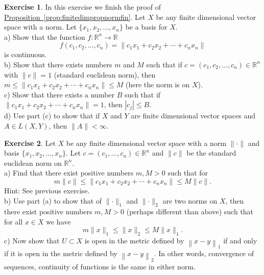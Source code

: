 \documentclass[12pt]{book}
\newcommand{\snorm}[1]{\lVert {#1} \rVert}
\newcommand{\abs}[1]{\left\lvert {#1} \right\rvert}
\newcommand{\norm}[1]{\left\lVert {#1} \right\rVert}
\newcommand{\R}{{\mathbb{R}}}
\theoremstyle{plain}
\theoremstyle{remark}
\theoremstyle{definition}
\theoremstyle{exercise}
\newtheorem{exercise}{Exercise}[section]
\theoremstyle{example}
\newcommand{\propref}[1]{\hyperref[#1]{Proposition~\ref*{#1}}}
\begin{document}
\begin{exercise}
In this exercise we finish the proof of \propref{prop:finitedimpropnormfin}.
Let $X$ be any finite dimensional vector space with a norm.  Let $\{ x_1,x_2,\ldots,x_n
\}$ be a basis for $X$. \\
a) Show that the function $f \colon \R^n \to \R$
\begin{equation*}
f(c_1,c_2,\ldots,c_n) = 
\snorm{c_1 x_1 + c_2 x_2 + \cdots + c_n x_n}
\end{equation*}
is continuous.
\\
b) Show that there exists numbers $m$ and $M$ such
that if $c = (c_1,c_2,\ldots,c_n) \in \R^n$ with
$\snorm{c} = 1$ (standard euclidean norm), then 
$m \leq \snorm{c_1 x_1 + c_2 x_2 + \cdots + c_n x_n} \leq M$ (here the
norm is on $X$).
\\
c) Show that there exists a number $B$ such that if
$\snorm{c_1 x_1 + c_2 x_2 + \cdots + c_n x_n}=1$,
then $\abs{c_j} \leq B$.
\\
d) Use part (c) to show that if $X$ and $Y$ are finite dimensional vector 
spaces and $A \in L(X,Y)$, then $\snorm{A} < \infty$.
\end{exercise}

\begin{exercise}
Let $X$ be any finite dimensional vector space with a norm $\snorm{\cdot}$
and basis $\{ x_1,x_2,\ldots,x_n
\}$.  Let $c = (c_1,\ldots,c_n) \in \R^n$ and $\snorm{c}$ be the
standard euclidean norm on $\R^n$.
\\
a) Find that there exist positive numbers $m,M > 0$ such that
for 
\begin{equation*}
m \snorm{c}
\leq
\snorm{c_1 x_1 + c_2 x_2 + \cdots + c_n x_n}
\leq
M \snorm{c} .
\end{equation*}
Hint: See previous exercise.
\\
b) Use part (a) to show that of
$\snorm{\cdot}_1$ and
$\snorm{\cdot}_2$ are two norms on $X$, then there exist positive
numbers $m,M > 0$ (perhaps different than above) such that
for all $x \in X$ we have
\begin{equation*}
m \snorm{x}_1
\leq
\snorm{x}_2
\leq
M \snorm{x}_1 .
\end{equation*}
c) Now show that $U \subset X$ is open in the metric defined by
$\norm{x-y}_1$ if and only if it is open in the metric defined by
$\norm{x-y}_2$.  In other words, convergence of sequences, continuity
of functions is the same in either norm.
\end{exercise}
\end{document}
